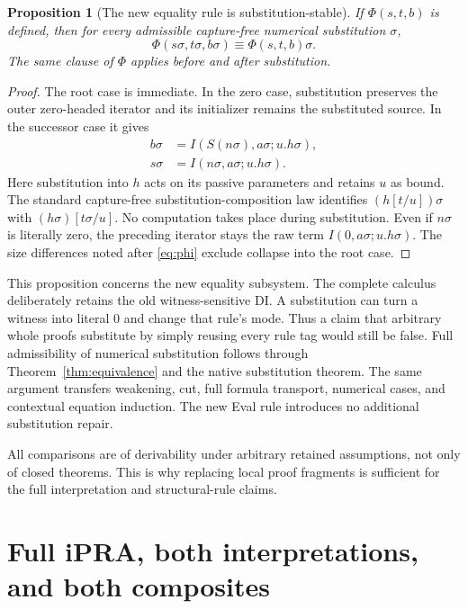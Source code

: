 \documentclass[11pt]{article}
\newtheorem{proposition}[theorem]{Proposition}
\theoremstyle{definition}
\newcommand{\syn}{\equiv}
\begin{document}
\begin{proposition}[The new equality rule is substitution-stable]
If $\Phi(s,t,b)$ is defined, then for every admissible capture-free
numerical substitution $\sigma$,
\[
 \Phi(s\sigma,t\sigma,b\sigma)
   \syn \Phi(s,t,b)\sigma.
\]
The same clause of $\Phi$ applies before and after substitution.
\end{proposition}
\begin{proof}
The root case is immediate. In the zero case, substitution preserves the
outer zero-headed iterator and its initializer remains the substituted
source. In the successor case it gives
\begin{align*}
 b\sigma&=I(S(n\sigma),a\sigma;u.h\sigma),\\
 s\sigma&=I(n\sigma,a\sigma;u.h\sigma).
\end{align*}
Here substitution into $h$ acts on its passive parameters and retains
$u$ as bound. The standard capture-free substitution-composition law
identifies $(h[t/u])\sigma$ with $(h\sigma)[t\sigma/u]$.
No computation takes place during substitution. Even if $n\sigma$ is
literally zero, the preceding iterator stays the raw term
$I(0,a\sigma;u.h\sigma)$. The size differences noted after
\eqref{eq:phi} exclude collapse into the root case.
\end{proof}

This proposition concerns the new equality subsystem. The complete
calculus deliberately retains the old witness-sensitive DI. A substitution
can turn a witness into literal $0$ and change that rule's mode. Thus a
claim that arbitrary whole proofs substitute by simply reusing every
rule tag would still be false. Full admissibility of numerical
substitution follows through Theorem~\ref{thm:equivalence} and the
native substitution theorem. The same argument transfers weakening,
cut, full formula transport, numerical cases, and contextual equation
induction. The new Eval rule introduces no additional substitution repair.

All comparisons are of derivability under arbitrary retained assumptions,
not only of closed theorems. This is why replacing local proof fragments
is sufficient for the full interpretation and structural-rule claims.

\section{Full iPRA, both interpretations, and both composites}
\label{sec:interpretation}
\end{document}
